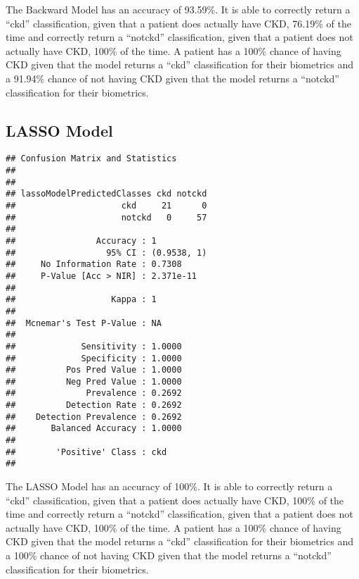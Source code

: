\documentclass[
]{article}
\newenvironment{Shaded}{\begin{snugshade}}{\end{snugshade}}
\newcommand{\FunctionTok}[1]{\textcolor[rgb]{0.00,0.00,0.00}{#1}}
\newcommand{\NormalTok}[1]{#1}
\newcommand{\SpecialCharTok}[1]{\textcolor[rgb]{0.00,0.00,0.00}{#1}}
\begin{document}
The Backward Model has an accuracy of 93.59\%. It is able to correctly
return a ``ckd'' classification, given that a patient does actually have
CKD, 76.19\% of the time and correctly return a ``notckd''
classification, given that a patient does not actually have CKD, 100\%
of the time. A patient has a 100\% chance of having CKD given that the
model returns a ``ckd'' classification for their biometrics and a
91.94\% chance of not having CKD given that the model returns a
``notckd'' classification for their biometrics.

\hypertarget{lasso-model-1}{%
\subsection{LASSO Model}\label{lasso-model-1}}

\begin{Shaded}
\end{Shaded}

\begin{verbatim}
## Confusion Matrix and Statistics
## 
##                           
## lassoModelPredictedClasses ckd notckd
##                     ckd     21      0
##                     notckd   0     57
##                                      
##                Accuracy : 1          
##                  95% CI : (0.9538, 1)
##     No Information Rate : 0.7308     
##     P-Value [Acc > NIR] : 2.371e-11  
##                                      
##                   Kappa : 1          
##                                      
##  Mcnemar's Test P-Value : NA         
##                                      
##             Sensitivity : 1.0000     
##             Specificity : 1.0000     
##          Pos Pred Value : 1.0000     
##          Neg Pred Value : 1.0000     
##              Prevalence : 0.2692     
##          Detection Rate : 0.2692     
##    Detection Prevalence : 0.2692     
##       Balanced Accuracy : 1.0000     
##                                      
##        'Positive' Class : ckd        
## 
\end{verbatim}

The LASSO Model has an accuracy of 100\%. It is able to correctly return
a ``ckd'' classification, given that a patient does actually have CKD,
100\% of the time and correctly return a ``notckd'' classification,
given that a patient does not actually have CKD, 100\% of the time. A
patient has a 100\% chance of having CKD given that the model returns a
``ckd'' classification for their biometrics and a 100\% chance of not
having CKD given that the model returns a ``notckd'' classification for
their biometrics.
\end{document}
